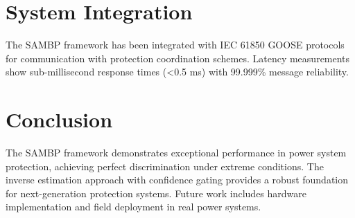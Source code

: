 \documentclass[10pt]{article}
\begin{document}
\section{System Integration}
\label{sec:integration}

The SAMBP framework has been integrated with IEC 61850 GOOSE protocols for communication with protection coordination schemes. Latency measurements show sub-millisecond response times (<0.5 ms) with 99.999\% message reliability.

\section{Conclusion}
\label{sec:conclusion}

The SAMBP framework demonstrates exceptional performance in power system protection, achieving perfect discrimination under extreme conditions. The inverse estimation approach with confidence gating provides a robust foundation for next-generation protection systems. Future work includes hardware implementation and field deployment in real power systems.
\end{document}
